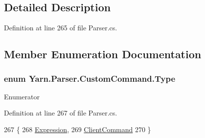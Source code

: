 \subsection{Detailed Description}


Definition at line 265 of file Parser.\-cs.



\subsection{Member Enumeration Documentation}
\hypertarget{a00077_a1d9f9f57c44e1a0d228793b658339576}{
\subsubsection[{Type}]{\setlength{\rightskip}{0pt plus 5cm}enum {\bf Yarn.\-Parser.\-Custom\-Command.\-Type}\hspace{0.3cm}{\ttfamily [package]}}}\label{a00077_a1d9f9f57c44e1a0d228793b658339576}
\begin{Desc}
\item[Enumerator]\par
\begin{description}
\item[{\em 
\hypertarget{a00077_a1d9f9f57c44e1a0d228793b658339576aa1a6657be79cc0fc1e9b23b9e108f043}{Expression}\label{a00077_a1d9f9f57c44e1a0d228793b658339576aa1a6657be79cc0fc1e9b23b9e108f043}
}]\item[{\em 
\hypertarget{a00077_a1d9f9f57c44e1a0d228793b658339576a278e9647d033d0df032a22caa7265586}{Client\-Command}\label{a00077_a1d9f9f57c44e1a0d228793b658339576a278e9647d033d0df032a22caa7265586}
}]\end{description}
\end{Desc}


Definition at line 267 of file Parser.\-cs.


\begin{DoxyCode}
267                                \{
268                 \hyperlink{a00077_a1d9f9f57c44e1a0d228793b658339576aa1a6657be79cc0fc1e9b23b9e108f043}{Expression},
269                 \hyperlink{a00077_a1d9f9f57c44e1a0d228793b658339576a278e9647d033d0df032a22caa7265586}{ClientCommand}
270             \}
\end{DoxyCode}


